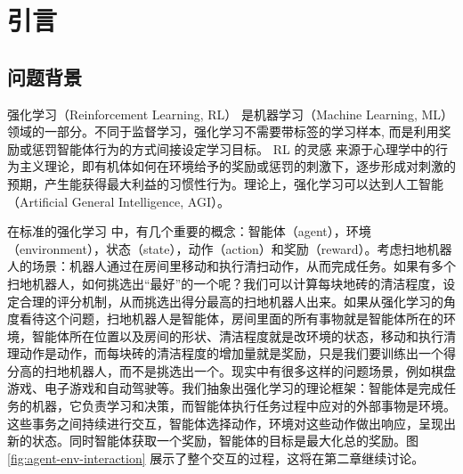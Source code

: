 
\chapter{引言}
\label{cha:introduction}

\section{问题背景}
\label{sec:background}

强化学习（Reinforcement Learning, RL）\cite{suttonReinforcementLearningIntroduction2018} \cite{ReinforcementLearning2021} \cite{salvadorREINFORCEMENTLEARNINGLITERATURE2020} 是机器学习（Machine Learning,  ML）领域的一部分。不同于监督学习，强化学习不需要带标签的学习样本, 而是利用奖励或惩罚智能体行为的方式间接设定学习目标。 RL 的灵感 \cite{ReinforcementLearning2021} 来源于心理学中的行为主义理论，即有机体如何在环境给予的奖励或惩罚的刺激下，逐步形成对刺激的预期，产生能获得最大利益的习惯性行为。理论上，强化学习可以达到人工智能（Artificial General Intelligence, AGI）\cite{salvadorREINFORCEMENTLEARNINGLITERATURE2020}。

在标准的强化学习 \cite{mnihAsynchronousMethodsDeep2016} 中，有几个重要的概念：智能体（agent），环境（environment），状态（state），动作（action）和奖励（reward）。考虑扫地机器人的场景：机器人通过在房间里移动和执行清扫动作，从而完成任务。如果有多个扫地机器人，如何挑选出“最好”的一个呢？我们可以计算每块地砖的清洁程度，设定合理的评分机制，从而挑选出得分最高的扫地机器人出来。如果从强化学习的角度看待这个问题，扫地机器人是智能体，房间里面的所有事物就是智能体所在的环境，智能体所在位置以及房间的形状、清洁程度就是改环境的状态，移动和执行清理动作是动作，而每块砖的清洁程度的增加量就是奖励，只是我们要训练出一个得分高的扫地机器人，而不是挑选出一个。现实中有很多这样的问题场景，例如棋盘游戏、电子游戏和自动驾驶等。我们抽象出强化学习的理论框架\cite{suttonReinforcementLearningIntroduction2018}：智能体是完成任务的机器，它负责学习和决策，而智能体执行任务过程中应对的外部事物是环境。这些事务之间持续进行交互，智能体选择动作，环境对这些动作做出响应，呈现出新的状态。同时智能体获取一个奖励，智能体的目标是最大化总的奖励。图 \ref{fig:agent-env-interaction} 展示了整个交互的过程，这将在第二章继续讨论。


